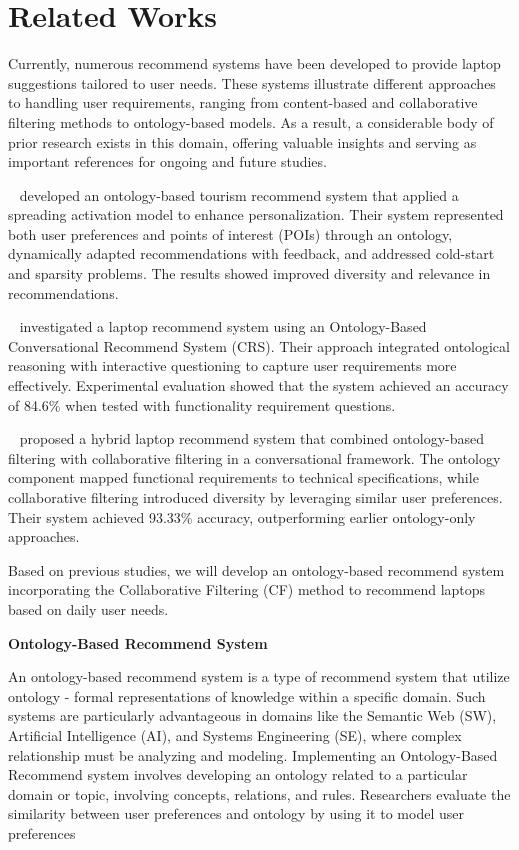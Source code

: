 \section{Related Works}
Currently, numerous recommend systems have been developed to provide laptop suggestions tailored to user needs. These systems illustrate different approaches to handling user requirements, ranging from content-based and collaborative filtering methods to ontology-based models. As a result, a considerable body of prior research exists in this domain, offering valuable insights and serving as important references for ongoing and future studies.



~\textcite{bahramian2015} developed an ontology-based tourism recommend system that applied a spreading activation model to enhance personalization. Their system represented both user preferences and points of interest (POIs) through an ontology, dynamically adapted recommendations with feedback, and addressed cold-start and sparsity problems. The results showed improved diversity and relevance in recommendations.

~\textcite{ayundhita2019} investigated a laptop recommend system using an Ontology-Based Conversational Recommend System (CRS). Their approach integrated ontological reasoning with interactive questioning to capture user requirements more effectively. Experimental evaluation showed that the system achieved an accuracy of 84.6\% when tested with functionality requirement questions.


~\textcite{putra2024} proposed a hybrid laptop recommend system that combined ontology-based filtering with collaborative filtering in a conversational framework. The ontology component mapped functional requirements to technical specifications, while collaborative filtering introduced diversity by leveraging similar user preferences. Their system achieved 93.33\% accuracy, outperforming earlier ontology-only approaches.

Based on previous studies, we will develop an ontology-based recommend system incorporating the Collaborative Filtering (CF) method to recommend laptops based on daily user needs.

\begin{flushleft}
	\textbf{Ontology-Based Recommend System}
\end{flushleft}

An ontology-based recommend system is a type of recommend system that utilize ontology - formal representations of knowledge within a specific domain. Such systems are particularly advantageous in domains like the Semantic Web (SW), Artificial Intelligence (AI), and Systems Engineering (SE), where complex relationship must be analyzing and modeling.
Implementing  an  Ontology-Based  Recommend  system  involves  developing  an  ontology  related  to  a particular domain or topic, involving concepts, relations, and rules. Researchers evaluate the similarity between user preferences and ontology by using it to model user preferences

